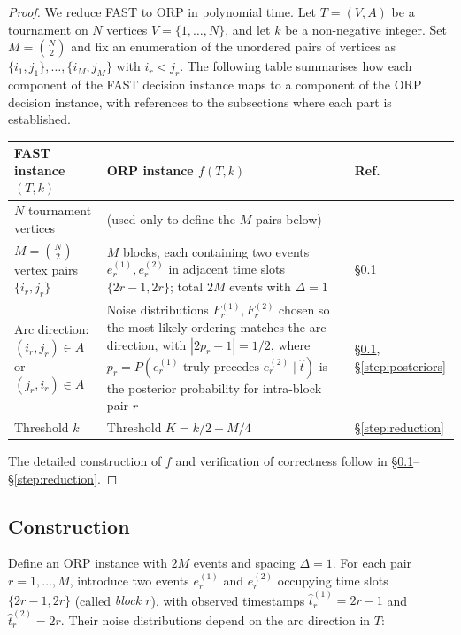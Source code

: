 \documentclass[11pt]{article}
\begin{document}
\begin{proof}
We reduce FAST to ORP in polynomial time. Let $T = (V, A)$ be a tournament on $N$ vertices $V = \{1, \ldots, N\}$, and let $k$ be a non-negative integer. Set $M = \binom{N}{2}$ and fix an enumeration of the unordered pairs of vertices as $\{i_1, j_1\}, \ldots, \{i_M, j_M\}$ with $i_r < j_r$.
The following table summarises how each component of the FAST decision instance maps to a component of the ORP decision instance, with references to the subsections where each part is established.

\begin{center}
\renewcommand{\arraystretch}{1.3}
\begin{tabular}{@{}p{}@{\;$\longrightarrow$\;}p{}@{\quad}p{}@{}}
\hline
\textbf{FAST instance $(T, k)$} & \textbf{ORP instance $f(T, k)$} & \textbf{Ref.} \\
\hline
$N$ tournament vertices & (used only to define the $M$ pairs below) & \\
$M = \binom{N}{2}$ vertex pairs $\{i_r, j_r\}$ & $M$ blocks, each containing two events $e_r^{(1)}, e_r^{(2)}$ in adjacent time slots $\{2r{-}1, 2r\}$; total $2M$ events with $\Delta = 1$ & \S\ref{step:construction} \\
Arc direction: $(i_r, j_r) \in A$ or $(j_r, i_r) \in A$ & Noise distributions $F_r^{(1)}, F_r^{(2)}$ chosen so the most-likely ordering matches the arc direction, with $|2p_r - 1| = 1/2$, where $p_r = P(e_r^{(1)} \text{ truly precedes } e_r^{(2)} \mid \hat{t})$ is the posterior probability for intra-block pair $r$ & \S\ref{step:construction}, \S\ref{step:posteriors} \\
Threshold $k$ & Threshold $K = k/2 + M/4$ & \S\ref{step:reduction} \\
\hline
\end{tabular}
\end{center}
The detailed construction of $f$ and verification of correctness follow in \S\ref{step:construction}--\S\ref{step:reduction}.
\end{proof}

\subsection{Construction}\label{step:construction}

Define an ORP instance with $2M$ events and spacing $\Delta = 1$. For each pair $r = 1, \ldots, M$, introduce two events $e_r^{(1)}$ and $e_r^{(2)}$ occupying time slots $\{2r-1, 2r\}$ (called \emph{block $r$}), with observed timestamps $\hat{t}_r^{(1)} = 2r - 1$ and $\hat{t}_r^{(2)} = 2r$. Their noise distributions depend on the arc direction in $T$:
\end{document}
